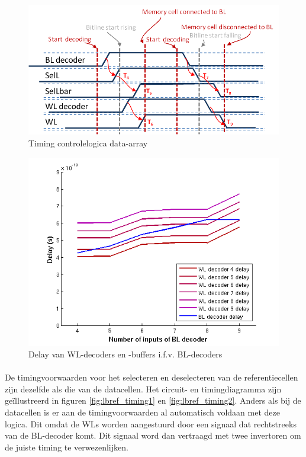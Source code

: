 \begin{figure}[!ht]
  \centering
  \includegraphics[scale=0.9]{../fig/hfdstk-timing-lbcell2.png}
  \caption[Data-array:timing]{Timing controlelogica data-array}
  \label{fig:lbcell_timing2}
\end{figure}

\begin{figure}[!ht]
  \centering
  \includegraphics[scale=0.6]{../fig/hfdstk-timing-decoder-dep.png}
  \caption[Delay van WL-decoders en -buffers i.f.v. BL-decoders]{Delay van WL-decoders en -buffers i.f.v. BL-decoders}
  \label{fig:decoder_dep}
\end{figure}

\paragraph{}
De timingvoorwaarden voor het selecteren en deselecteren van de referentiecellen zijn dezelfde als die van de datacellen. Het circuit- en timingdiagramma zijn geïllustreerd in figuren \ref{fig:lbref_timing1} en \ref{fig:lbref_timing2}. Anders als bij de datacellen is er aan de timingvoorwaarden al automatisch voldaan met deze logica. Dit omdat de WLs worden aangestuurd door een signaal dat rechtstreeks van de BL-decoder komt. Dit signaal word dan vertraagd met twee invertoren om de juiste timing te verwezenlijken.


